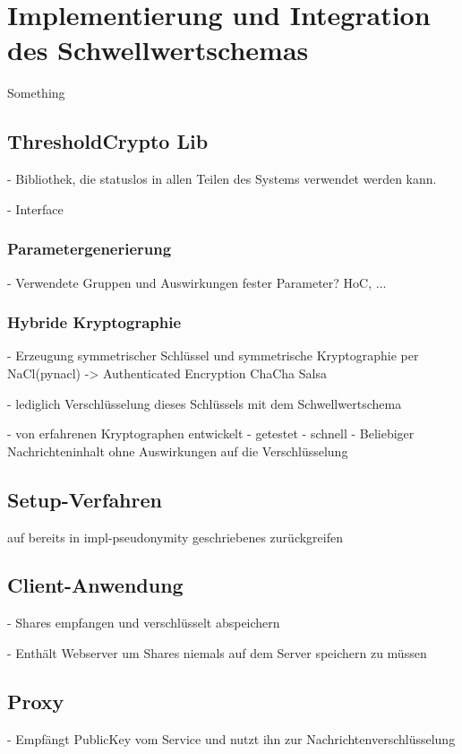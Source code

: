 \section{Implementierung und Integration des Schwellwertschemas}

\label{sec_impl_threshold}

Something

\subsection{ThresholdCrypto \glqq Lib\grqq{}}

- Bibliothek, die statuslos in allen Teilen des Systems verwendet werden kann.

- Interface

  \subsubsection{Parametergenerierung}
  
  - Verwendete Gruppen und Auswirkungen fester Parameter? HoC, ...
  
  \subsubsection{Hybride Kryptographie}
  
  - Erzeugung symmetrischer Schlüssel und symmetrische Kryptographie per NaCl(pynacl) -> Authenticated Encryption ChaCha Salsa
  
  - lediglich Verschlüsselung dieses Schlüssels mit dem Schwellwertschema
  
  - von erfahrenen Kryptographen entwickelt
  - getestet
  - schnell
  - Beliebiger Nachrichteninhalt ohne Auswirkungen auf die Verschlüsselung

\subsection{Setup-Verfahren}

auf bereits in impl-pseudonymity geschriebenes zurückgreifen

\subsection{Client-Anwendung}

- Shares empfangen und verschlüsselt abspeichern

- Enthält Webserver um Shares niemals auf dem Server speichern zu müssen

\subsection{Proxy}

- Empfängt PublicKey vom Service und nutzt ihn zur Nachrichtenverschlüsselung


